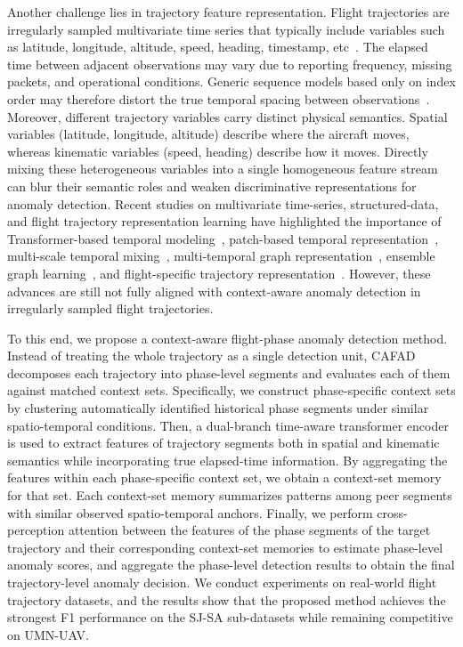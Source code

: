 \documentclass[iicol,pdflatex,sn-basic,Numbered]{sn-jnl}%
\theoremstyle{thmstyleone}%
\theoremstyle{thmstyletwo}%
\theoremstyle{thmstylethree}%
\begin{document}
Another challenge lies in trajectory feature representation. 
Flight trajectories are irregularly sampled multivariate time series that typically include variables such as latitude, longitude, altitude, speed, heading, timestamp, etc~\cite{ahmed2026towards}.
The elapsed time between adjacent observations may vary due to reporting frequency, missing packets, and operational conditions. 
Generic sequence models based only on index order may therefore distort the true temporal spacing between observations~\cite{kreindler2016effects,li2020learning,kidger2020neuralcde,shukla2021mtnet,braun2022sampling}. 
Moreover, different trajectory variables carry distinct physical semantics. 
Spatial variables (latitude, longitude, altitude) describe where the aircraft moves, whereas kinematic variables (speed, heading) describe how it moves. 
Directly mixing these heterogeneous variables into a single homogeneous feature stream can blur their semantic roles and weaken discriminative representations for anomaly detection. 
Recent studies on multivariate time-series, structured-data, and flight trajectory representation learning have highlighted the importance of Transformer-based temporal modeling~\cite{zerveas2021transformer,xu2022anomalytransformer}, patch-based temporal representation~\cite{nie2023patchtst}, multi-scale temporal mixing~\cite{wang2024timemixer}, multi-temporal graph representation~\cite{guang2025mtpnet}, ensemble graph learning~\cite{guang2026ensnet}, and flight-specific trajectory representation~\cite{aerospace9020091,10877800,liu2025effective}.
However, these advances are still not fully aligned with context-aware anomaly detection in irregularly sampled flight trajectories.

To this end, we propose a context-aware flight-phase anomaly detection method. 
Instead of treating the whole trajectory as a single detection unit, CAFAD decomposes each trajectory into phase-level segments and evaluates each of them against matched context sets. 
Specifically, we construct phase-specific context sets by clustering automatically identified historical phase segments under similar spatio-temporal conditions. 
Then, a dual-branch time-aware transformer encoder is used to extract features of trajectory segments both in spatial and kinematic semantics while incorporating true elapsed-time information. 
By aggregating the features within each phase-specific context set, we obtain a context-set memory for that set.
Each context-set memory summarizes patterns among peer segments with similar observed spatio-temporal anchors. 
Finally, we perform cross-perception attention between the features of the phase segments of the target trajectory and their corresponding context-set memories to estimate phase-level anomaly scores, and aggregate the phase-level detection results to obtain the final trajectory-level anomaly decision.
We conduct experiments on real-world flight trajectory datasets, and the results show that the proposed method achieves the strongest F1 performance on the SJ-SA sub-datasets while remaining competitive on UMN-UAV.
\end{document}
